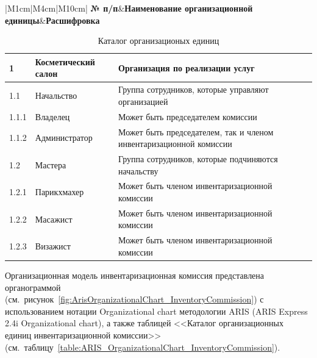 \begin{table}[h!]
    \centering

    \footnotesize

    \caption{Каталог организационых единиц}

    \label{table:ARIS_OrganizationalChart}

    \begin{tabular}{|M{1cm}|M{4cm}|M{10cm}|} 
        \hline
        \textbf{№ п/п}&\textbf{Наименование организационной единицы}&\textbf{Расшифровка}\\ \hline
    \end{tabular}

    \begin{tabular}{|p{1cm}|p{4cm}|p{10cm}|} 
        \hline
        1       &Косметический салон    &Организация по реализации услуг\\ \hline
        1.1     &Начальство             &Группа сотрудников, которые управляют организацией\\ \hline
        1.1.1   &Владелец               &Может быть председателем комиссии\\ \hline
        1.1.2   &Администратор          &Может быть председателем, так и членом инвентаризационной комиссии\\ \hline
        1.2     &Мастера                &Группа сотрудников, которые подчиняются начальству\\ \hline
        1.2.1   &Парикхмахер            &Может быть членом инвентаризационной комиссии\\ \hline
        1.2.2   &Масажист               &Может быть членом инвентаризационной комиссии\\ \hline
        1.2.3   &Визажист               &Может быть членом инвентаризационной комиссии\\ \hline
    \end{tabular}
\end{table}

Организационная модель инвентаризационная комиссия представлена органограммой
(см.~рисунок~\ref{fig:ArisOrganizationalChart_InventoryCommission})
с использованием нотации Organizational chart методологии ARIS
(ARIS Express 2.4i \cite{ArisExpress} Organizational chart),
а также таблицей <<Каталог организационных единиц инвентаризационной комиссии>>
(см.~таблицу~\ref{table:ARIS_OrganizationalChart_InventoryCommission}).

